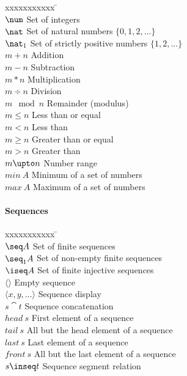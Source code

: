 \documentclass{article}
\begin{document}
\begin{tabbing}
xxxxxxxxxxx \= \kill \\ 
$\num$ \> Set of integers \\
$\nat$ \> Set of natural numbers $\{ 0, 1, 2, \dots \}$ \\
$\nat_1$ \> Set of strictly positive numbers $\{ 1, 2, \dots \}$ \\
$m+n$ \> Addition \\
$m-n$ \> Subtraction \\
$m*n$ \> Multiplication \\
$m \div n$ \> Division \\
$m \mod n$ \> Remainder (modulus) \\
$m \leq n$ \> Less than or equal \\
$m < n$ \> Less than \\
$m \geq n$ \> Greater than or equal \\
$m > n$ \> Greater than \\
$m \upto n$ \> Number range \\
$min~A$ \> Minimum of a set of numbers \\
$max~A$ \> Maximum of a set of numbers \\
\end{tabbing}

\paragraph{Sequences}

\begin{tabbing}
xxxxxxxxxxx \= \kill \\ 
$\seq A$ \> Set of finite sequences \\
$\seq_1 A$ \> Set of non-empty finite sequences \\
$\iseq A$ \> Set of finite injective sequences \\
$\langle \rangle$ \> Empty sequence \\
$\langle x, y, \dots \rangle$ \> Sequence display \\
$s \cat t$ \> Sequence concatenation \\
$head~s$ \> First element of a sequence \\
$tail~s$ \> All but the head element of a sequence \\
$last~s$ \> Last element of a sequence \\
$front~s$ \> All but the last element of a sequence \\
$s \inseq t$ \> Sequence segment relation \\
\end{tabbing}
\end{document}
